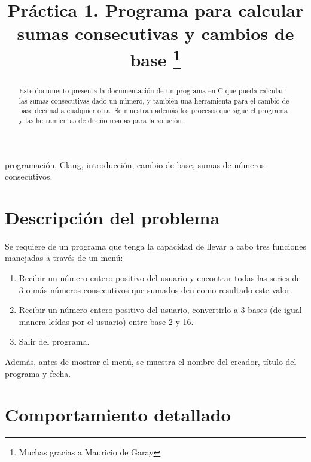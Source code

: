 \documentclass[conference]{IEEEtran}
\begin{document}
\title{Práctica 1. Programa para calcular sumas consecutivas y cambios de base
\thanks{Muchas gracias a Mauricio de Garay}
}

\author{
}

\maketitle

\begin{abstract}
Este documento presenta la documentación de un programa en C que pueda calcular
las sumas consecutivas dado un número, y también una herramienta para el cambio
de base decimal a cualquier otra. Se muestran además los procesos que sigue el
programa y las herramientas de diseño usadas para la solución. 
\end{abstract}

\begin{IEEEkeywords}
programación, Clang, introducción, cambio de base, sumas de números consecutivos.
\end{IEEEkeywords}

\section{Descripción del problema}
Se requiere de un programa que tenga la capacidad de llevar a cabo tres funciones 
manejadas a través de un menú:
\begin{enumerate}
    \item Recibir un número entero positivo del usuario y encontrar todas las series de 3 o más números consecutivos que sumados den como resultado este valor.
    \item Recibir un número entero positivo del usuario, convertirlo a 3 bases (de igual manera leídas por el usuario) entre base 2 y 16.
    \item Salir del programa. 
\end{enumerate}
Además, antes de mostrar el menú, se muestra el nombre del creador, título del programa y fecha. 

\section{Comportamiento detallado}
\end{document}
